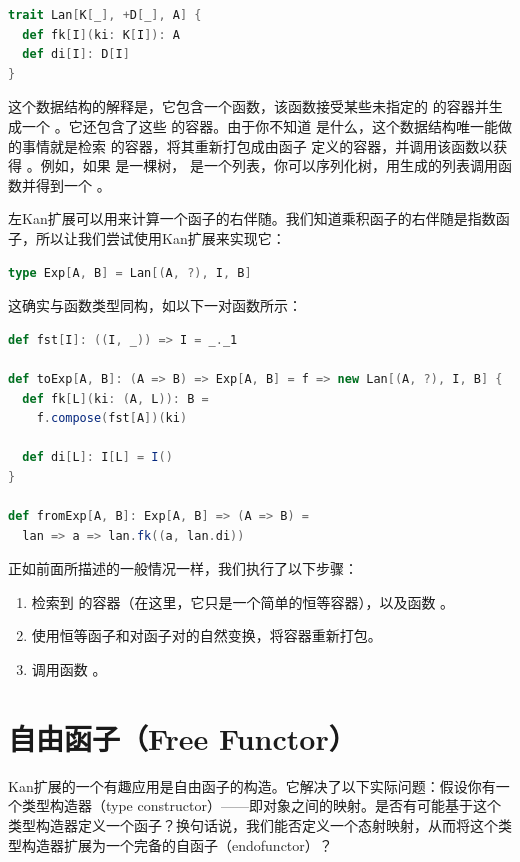 \begin{lstlisting}[language=Scala]
trait Lan[K[_], +D[_], A] {
  def fk[I](ki: K[I]): A
  def di[I]: D[I]
}
\end{lstlisting}
这个数据结构的解释是，它包含一个函数，该函数接受某些未指定的  的容器并生成一个 。它还包含了这些  的容器。由于你不知道  是什么，这个数据结构唯一能做的事情就是检索  的容器，将其重新打包成由函子  定义的容器，并调用该函数以获得 。例如，如果  是一棵树， 是一个列表，你可以序列化树，用生成的列表调用函数并得到一个 。

左Kan扩展可以用来计算一个函子的右伴随。我们知道乘积函子的右伴随是指数函子，所以让我们尝试使用Kan扩展来实现它：

\begin{lstlisting}[language=Scala]
type Exp[A, B] = Lan[(A, ?), I, B]
\end{lstlisting}
这确实与函数类型同构，如以下一对函数所示：

\begin{lstlisting}[language=Scala]
def fst[I]: ((I, _)) => I = _._1

def toExp[A, B]: (A => B) => Exp[A, B] = f => new Lan[(A, ?), I, B] {
  def fk[L](ki: (A, L)): B =
    f.compose(fst[A])(ki)

  def di[L]: I[L] = I()
}

def fromExp[A, B]: Exp[A, B] => (A => B) =
  lan => a => lan.fk((a, lan.di))
\end{lstlisting}
正如前面所描述的一般情况一样，我们执行了以下步骤：

\begin{enumerate}
  \tightlist
  \item
  检索到  的容器（在这里，它只是一个简单的恒等容器），以及函数 。
  \item
  使用恒等函子和对函子对的自然变换，将容器重新打包。
  \item
  调用函数 。
\end{enumerate}

\section{自由函子（Free Functor）}

Kan扩展的一个有趣应用是自由函子的构造。它解决了以下实际问题：假设你有一个类型构造器（type constructor）——即对象之间的映射。是否有可能基于这个类型构造器定义一个函子？换句话说，我们能否定义一个态射映射，从而将这个类型构造器扩展为一个完备的自函子（endofunctor）？

